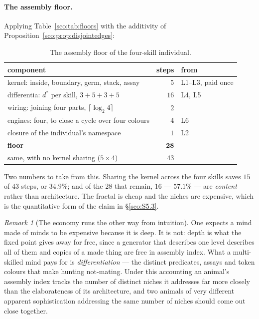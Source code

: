 \documentclass[11pt]{article}
\theoremstyle{plain}
\theoremstyle{definition}
\theoremstyle{remark}
\newtheorem{remark}[theorem]{Remark}
\begin{document}
\paragraph{The assembly floor.}
Applying Table~\ref{sco:tab:floors} with the additivity of
Proposition~\ref{sco:prop:disjointedges}:

\begin{table}[h]
\centering
\begin{tabular}{lrl}
\toprule
component & steps & from \\
\midrule
kernel: inside, boundary, germ, stack, assay & $5$ & L1--L3, paid once \\
differentia: $d^\ast$ per skill, $3+5+3+5$   & $16$ & L4, L5 \\
wiring: joining four parts, $\lceil \log_2 4\rceil$ & $2$ & \\
engines: four, to close a cycle over four colours & $4$ & L6 \\
closure of the individual's namespace        & $1$ & L2 \\
\midrule
\textbf{floor} & $\mathbf{28}$ & \\
\midrule
same, with no kernel sharing ($5 \times 4$)  & $43$ & \\
\bottomrule
\end{tabular}
\caption{The assembly floor of the four-skill individual.}
\label{sco:tab:floor}
\end{table}

Two numbers to take from this. Sharing the kernel across the four skills
saves $15$ of $43$ steps, or $34.9\%$; and of the $28$ that remain,
$16$ --- $57.1\%$ --- are \emph{content} rather than architecture. The
fractal is cheap and the niches are expensive, which is the quantitative
form of the claim in \S\ref{sco:S5.3}.

\begin{remark}[The economy runs the other way from intuition]
\label{sco:rem:economy}
One expects a mind made of minds to be expensive because it is deep. It is
not: depth is what the fixed point gives away for free, since a generator
that describes one level describes all of them and copies of a made thing
are free in assembly index. What a multi-skilled mind pays for is
\emph{differentiation} --- the distinct predicates, assays and token
colours that make hunting not-mating. Under this accounting an animal's
assembly index tracks the number of distinct niches it addresses far more
closely than the elaborateness of its architecture, and two animals of very
different apparent sophistication addressing the same number of niches
should come out close together.
\end{remark}
\end{document}

